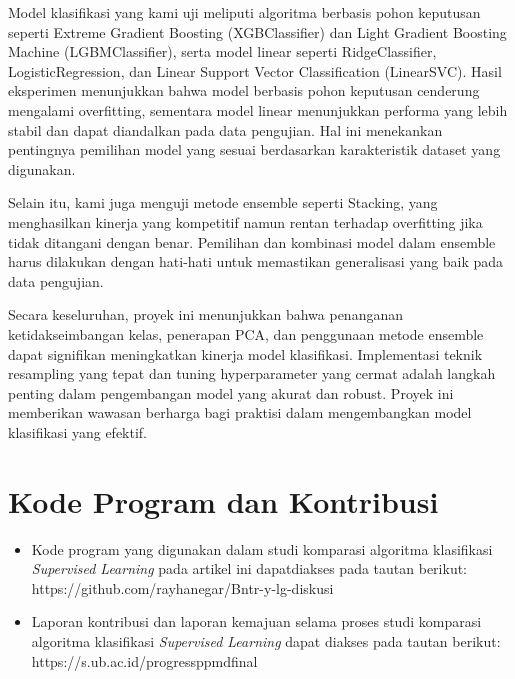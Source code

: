 \documentclass[conference]{IEEEtran}
\begin{document}
Model klasifikasi yang kami uji meliputi algoritma berbasis pohon keputusan seperti Extreme Gradient Boosting (XGBClassifier) dan Light Gradient Boosting Machine (LGBMClassifier), serta model linear seperti RidgeClassifier, LogisticRegression, 
dan Linear Support Vector Classification (LinearSVC). Hasil eksperimen menunjukkan bahwa model berbasis pohon keputusan cenderung mengalami overfitting, sementara model linear menunjukkan performa yang lebih stabil dan dapat diandalkan 
pada data pengujian. Hal ini menekankan pentingnya pemilihan model yang sesuai berdasarkan karakteristik dataset yang digunakan.

Selain itu, kami juga menguji metode ensemble seperti Stacking, yang menghasilkan kinerja yang kompetitif namun rentan terhadap overfitting jika tidak ditangani dengan benar. Pemilihan dan kombinasi model dalam ensemble harus dilakukan dengan 
hati-hati untuk memastikan generalisasi yang baik pada data pengujian.

Secara keseluruhan, proyek ini menunjukkan bahwa penanganan ketidakseimbangan kelas, penerapan PCA, dan penggunaan metode ensemble dapat signifikan meningkatkan kinerja model klasifikasi. Implementasi teknik resampling yang 
tepat dan tuning hyperparameter yang cermat adalah langkah penting dalam pengembangan model yang akurat dan robust. Proyek ini memberikan wawasan berharga bagi praktisi dalam mengembangkan model klasifikasi yang efektif.

\section{Kode Program dan Kontribusi}
\begin{itemize}
    \item Kode program yang digunakan dalam studi komparasi algoritma klasifikasi \textit{Supervised Learning} pada artikel ini dapatdiakses pada tautan berikut: https://github.com/rayhanegar/Bntr-y-lg-diskusi
    \item Laporan kontribusi dan laporan kemajuan selama proses studi komparasi algoritma klasifikasi \textit{Supervised Learning} dapat diakses pada tautan berikut: https://s.ub.ac.id/progressppmdfinal
\end{itemize}
\end{document}
